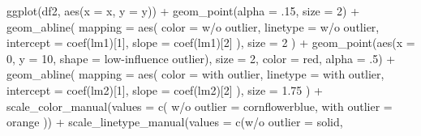 \documentclass[
  letterpaper,
  DIV=11,
  numbers=noendperiod]{scrreport}
\newenvironment{Shaded}{\begin{snugshade}}{\end{snugshade}}
\newcommand{\AttributeTok}[1]{\textcolor[rgb]{0.40,0.45,0.13}{#1}}
\newcommand{\DecValTok}[1]{\textcolor[rgb]{0.68,0.00,0.00}{#1}}
\newcommand{\FloatTok}[1]{\textcolor[rgb]{0.68,0.00,0.00}{#1}}
\newcommand{\FunctionTok}[1]{\textcolor[rgb]{0.28,0.35,0.67}{#1}}
\newcommand{\NormalTok}[1]{\textcolor[rgb]{0.00,0.23,0.31}{#1}}
\newcommand{\OtherTok}[1]{\textcolor[rgb]{0.00,0.23,0.31}{#1}}
\newcommand{\SpecialCharTok}[1]{\textcolor[rgb]{0.37,0.37,0.37}{#1}}
\newcommand{\StringTok}[1]{\textcolor[rgb]{0.13,0.47,0.30}{#1}}
\begin{document}
\begin{Shaded}
\begin{Highlighting}[]
\FunctionTok{ggplot}\NormalTok{(df2, }\FunctionTok{aes}\NormalTok{(}\AttributeTok{x =}\NormalTok{ x, }\AttributeTok{y =}\NormalTok{ y)) }\SpecialCharTok{+} 
  \FunctionTok{geom\_point}\NormalTok{(}\AttributeTok{alpha =}\NormalTok{ .}\DecValTok{15}\NormalTok{, }\AttributeTok{size =} \DecValTok{2}\NormalTok{) }\SpecialCharTok{+} 
  \FunctionTok{geom\_abline}\NormalTok{(}
    \AttributeTok{mapping =} \FunctionTok{aes}\NormalTok{(}
      \AttributeTok{color =} \StringTok{\textquotesingle{}w/o outlier\textquotesingle{}}\NormalTok{,}
      \AttributeTok{linetype =} \StringTok{\textquotesingle{}w/o outlier\textquotesingle{}}\NormalTok{,}
      \AttributeTok{intercept =} \FunctionTok{coef}\NormalTok{(lm1)[}\DecValTok{1}\NormalTok{],}
      \AttributeTok{slope =} \FunctionTok{coef}\NormalTok{(lm1)[}\DecValTok{2}\NormalTok{]}
\NormalTok{    ),}
    \AttributeTok{size =} \DecValTok{2}
\NormalTok{  ) }\SpecialCharTok{+}
  \FunctionTok{geom\_point}\NormalTok{(}\FunctionTok{aes}\NormalTok{(}\AttributeTok{x =} \DecValTok{0}\NormalTok{, }\AttributeTok{y =} \DecValTok{10}\NormalTok{, }\AttributeTok{shape =} \StringTok{\textquotesingle{}low{-}influence outlier\textquotesingle{}}\NormalTok{), }\AttributeTok{size =} \DecValTok{2}\NormalTok{, }\AttributeTok{color =} \StringTok{\textquotesingle{}red\textquotesingle{}}\NormalTok{, }\AttributeTok{alpha =}\NormalTok{ .}\DecValTok{5}\NormalTok{) }\SpecialCharTok{+} 
  \FunctionTok{geom\_abline}\NormalTok{(}
    \AttributeTok{mapping =} \FunctionTok{aes}\NormalTok{(}
      \AttributeTok{color =} \StringTok{\textquotesingle{}with outlier\textquotesingle{}}\NormalTok{,}
      \AttributeTok{linetype =} \StringTok{\textquotesingle{}with outlier\textquotesingle{}}\NormalTok{,}
      \AttributeTok{intercept =} \FunctionTok{coef}\NormalTok{(lm2)[}\DecValTok{1}\NormalTok{],}
      \AttributeTok{slope =} \FunctionTok{coef}\NormalTok{(lm2)[}\DecValTok{2}\NormalTok{]}
\NormalTok{    ),}
    \AttributeTok{size =} \FloatTok{1.75}
\NormalTok{  ) }\SpecialCharTok{+}
  \FunctionTok{scale\_color\_manual}\NormalTok{(}\AttributeTok{values =} \FunctionTok{c}\NormalTok{(}
    \StringTok{\textquotesingle{}w/o outlier\textquotesingle{}} \OtherTok{=} \StringTok{\textquotesingle{}cornflowerblue\textquotesingle{}}\NormalTok{,}
    \StringTok{\textquotesingle{}with outlier\textquotesingle{}} \OtherTok{=} \StringTok{\textquotesingle{}orange\textquotesingle{}}
\NormalTok{  )) }\SpecialCharTok{+}
  \FunctionTok{scale\_linetype\_manual}\NormalTok{(}\AttributeTok{values =} \FunctionTok{c}\NormalTok{(}\StringTok{\textquotesingle{}w/o outlier\textquotesingle{}} \OtherTok{=} \StringTok{\textquotesingle{}solid\textquotesingle{}}\NormalTok{,}

\end{Highlighting}
\end{Shaded}
\end{document}
